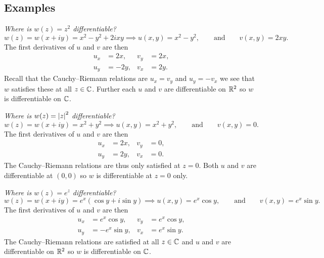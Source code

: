 \documentclass{article}
\begin{document}
    \subsection{Examples}
    \begin{example}
        \textit{Where is \(w(z) = z^2\) differentiable?}
        \[w(z) = w(x + iy) = x^2 - y^2 + 2ixy \implies u(x, y) = x^2 - y^2, \qquad\text{and}\qquad v(x, y) = 2xy.\]
        The first derivatives of \(u\) and \(v\) are then
        \begin{align*}
            u_x &= 2x, & v_y &= 2x,\\
            u_y &= -2y, & v_x &= 2y.
        \end{align*}
        Recall that the Cauchy--Riemann relations are \(u_x = v_y\) and \(u_y = -v_x\) we see that \(w\) satisfies these at all \(z \in\mathbb{C}\).
        Further each \(u\) and \(v\) are differentiable on \(\mathbb{R}^2\) so \(w\) is differentiable on \(\mathbb{C}\).
    \end{example}
    \begin{example}
        \textit{Where is \(w(z) = \abs{z}^2\) differentiable?}
        \[w(z) = w(x + iy) = x^2 + y^2 \implies u(x, y) = x^2 + y^2, \qquad\text{and}\qquad v(x, y) = 0.\]
        The first derivatives of \(u\) and \(v\) are then
        \begin{align*}
            u_x &= 2x, & v_y &= 0,\\
            u_y &= 2y, & v_x &= 0.
        \end{align*}
        The Cauchy--Riemann relations are thus only satisfied at \(z = 0\).
        Both \(u\) and \(v\) are differentiable at \((0, 0)\) so \(w\) is differentiable at \(z = 0\) only.
    \end{example}
    \begin{example}
        \textit{Where is \(w(z) = e^z\) differentiable?}
        \[w(z) = w(x + iy) = e^x(\cos y + i\sin y) \implies u(x, y) = e^x\cos y, \qquad\text{and}\qquad v(x, y) = e^x\sin y.\]
        The first derivatives of \(u\) and \(v\) are then
        \begin{align*}
            u_x &= e^x\cos y, & v_y &= e^x\cos y,\\
            u_y &= -e^x\sin y, & v_x &= e^x\sin y.
        \end{align*}
        The Cauchy--Riemann relations are satisfied at all \(z\in\mathbb{C}\) and \(u\) and \(v\) are differentiable on \(\mathbb{R}^2\) so \(w\) is differentiable on \(\mathbb{C}\).
    \end{example}
\end{document}
